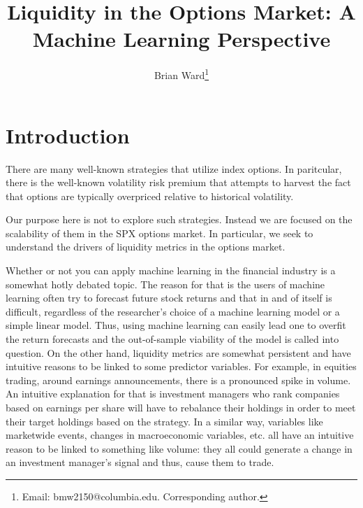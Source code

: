 \documentclass[12pt]{article}
\numberwithin{theorem}{section}
\numberwithin{equation}{section}
\numberwithin{remark}{section}
\numberwithin{definition}{section}
\numberwithin{theorem}{section}
\numberwithin{lemma}{section}
\numberwithin{example}{section}
\begin{document}
\title{Liquidity in the Options Market: A Machine Learning Perspective}
\author{Brian Ward\thanks{Email: {bmw2150@columbia.edu}. Corresponding author. }} 
\maketitle
{}

\tableofcontents

\newpage

\setcounter{section}{0}

\section{Introduction}
There are many well-known strategies that utilize index options. In paritcular, there is the well-known volatility risk premium that attempts to harvest the fact that options are typically overpriced relative to historical volatility. 

Our purpose here is not to explore such strategies. Instead we are focused on the scalability of them in the SPX options market. In particular, we seek to understand the drivers of liquidity metrics in the options market. 

Whether or not you can apply machine learning in the financial industry is a somewhat hotly debated topic. The reason for that is the users of machine learning often try to forecast future stock returns and that in and of itself is difficult, regardless of the researcher's choice of a machine learning model or a simple linear model. Thus, using machine learning can easily lead one to overfit the return forecasts and the out-of-sample viability of the model is called into question. On the other hand, liquidity metrics are somewhat persistent and have intuitive reasons to be linked to some predictor variables. For example, in equities trading, around earnings announcements, there is a pronounced spike in volume. An intuitive explanation for that is investment managers who rank companies based on earnings per share will have to rebalance their holdings in order to meet their target holdings based on the strategy. In a similar way, variables like marketwide events, changes in macroeconomic variables, etc. all have an intuitive reason to be linked to something like volume: they all could generate a change in an investment manager's signal and thus, cause them to trade. 
\end{document}

